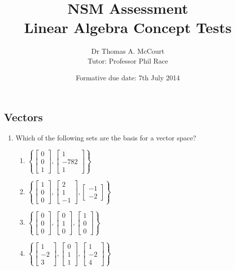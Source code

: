 \documentclass[12pt]{article}
\begin{document}
\title{\bf NSM Assessment\\
{\large Linear Algebra Concept Tests}}
\author{Dr Thomas A. McCourt\\
Tutor: Professor Phil Race}
\date{Formative due date: 7th July 2014}


\subsection*{Vectors}
\begin{enumerate}
\item Which of the following sets are the basis for a vector space?
\begin{enumerate}
\item $\left\{ \left[\begin{array}{c}0\\0\\1\end{array}\right], \left[\begin{array}{c}1\\-782\\1\end{array}\right]\right\}$
\item $\left\{ \left[\begin{array}{c}1\\0\\0\end{array}\right], \left[\begin{array}{c}2\\1\\-1\end{array}\right], \left[\begin{array}{c}-1\\-2\end{array}\right]\right\}$
\item $\left\{ \left[\begin{array}{c}0\\0\\0\end{array}\right], \left[\begin{array}{c}0\\1\\0\end{array}\right], \left[\begin{array}{c}1\\0\\0\end{array}\right]\right\}$
\item $\left\{ \left[\begin{array}{c}1\\-2\\3\end{array}\right], \left[\begin{array}{c}0\\1\\1\end{array}\right], \left[\begin{array}{c}1\\-2\\4\end{array}\right]\right\}$
\end{enumerate}


\end{enumerate}
\end{document}
